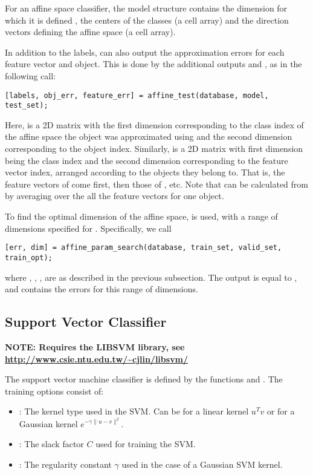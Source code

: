 \documentclass{article}
\begin{document}
For an affine space classifier, the model structure contains the dimension for which it is defined , the centers of the classes  (a cell array) and the direction vectors defining the affine space  (a cell array).

In addition to the labels,  can also output the approximation errors for each feature vector and object. This is done by the additional outputs  and , as in the following call:
\begin{lstlisting}
[labels, obj_err, feature_err] = affine_test(database, model, test_set);
\end{lstlisting}
Here,  is a 2D matrix with the first dimension corresponding to the class index of the affine space the object was approximated using and the second dimension corresponding to the object index. Similarly,  is a 2D matrix with first dimension being the class index and the second dimension corresponding to the feature vector index, arranged according to the objects they belong to. That is, the feature vectors of  come first, then those of , etc. Note that  can be calculated from  by averaging over the all the feature vectors for one object.

To find the optimal dimension of the affine space,  is used, with a range of dimensions specified for . Specifically, we call
\begin{lstlisting}
[err, dim] = affine_param_search(database, train_set, valid_set, train_opt);
\end{lstlisting}
where , , ,  are as described in the previous subsection. The output  is equal to , and  contains the errors for this range of dimensions.

\subsection{Support Vector Classifier}

\textbf{NOTE: Requires the LIBSVM library, see \url{http://www.csie.ntu.edu.tw/~cjlin/libsvm/}}

The support vector machine classifier is defined by the functions  and . The training options consist of:
\begin{itemize}
	\item {}: The kernel type used in the SVM. Can be  for a linear kernel $u^Tv$ or  for a Gaussian kernel $e^{-\gamma\|u-v\|^2}$.
	\item {}: The slack factor $C$ used for training the SVM.
	\item {}: The regularity constant $\gamma$ used in the case of a Gaussian SVM kernel.
\end{itemize}
\end{document}
